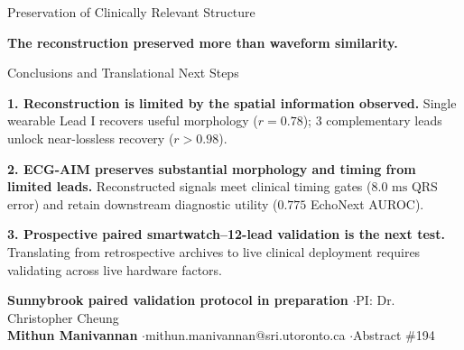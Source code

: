 \documentclass[aspectratio=169,10pt]{beamer}
\begin{document}
\begin{frame}{Preservation of Clinically Relevant Structure}
  \vskip 6pt
  \begin{tcolorbox}[cardstyle,colframe=SuccessGreen,top=2.2mm,bottom=2.2mm]
    \centering\fontsize{10}{12.5}\selectfont
    \textbf{\color{SuccessGreen}The reconstruction preserved more than waveform similarity.}
  \end{tcolorbox}
\end{frame}

\begin{frame}{Conclusions and Translational Next Steps}
  \vspace{-0.4em}
  \begin{tcolorbox}[cardstyle,colframe=Navy,top=2.2mm,bottom=2.2mm]
    \fontsize{9.5}{12.5}\selectfont
    \textbf{\color{Navy}1. Reconstruction is limited by the spatial information observed.} Single wearable Lead I recovers useful morphology ($r = 0.78$); 3 complementary leads unlock near-lossless recovery ($r > 0.98$).
  \end{tcolorbox}

  \vskip 4pt
  \begin{tcolorbox}[cardstyle,colframe=NavyLight,top=2.2mm,bottom=2.2mm]
    \fontsize{9.5}{12.5}\selectfont
    \textbf{\color{NavyLight}2. ECG-AIM preserves substantial morphology and timing from limited leads.} Reconstructed signals meet clinical timing gates ($8.0\text{ ms}$ QRS error) and retain downstream diagnostic utility ($0.775$ EchoNext AUROC).
  \end{tcolorbox}

  \vskip 4pt
  \begin{tcolorbox}[cardstyle,colframe=SuccessGreen,top=2.2mm,bottom=2.2mm]
    \fontsize{9.5}{12.5}\selectfont
    \textbf{\color{SuccessGreen}3. Prospective paired smartwatch--12-lead validation is the next test.} Translating from retrospective archives to live clinical deployment requires validating across live hardware factors.
  \end{tcolorbox}

  \vskip 6pt
  \centering\fontsize{8}{10}\selectfont\color{SlateMuted}
  \textbf{Sunnybrook paired validation protocol in preparation} \enspace$\cdot$\enspace PI: Dr. Christopher Cheung\\[0.2em]
  \textbf{Mithun Manivannan} \enspace$\cdot$\enspace mithun.manivannan@sri.utoronto.ca \enspace$\cdot$\enspace Abstract \#194
\end{frame}
\end{document}

